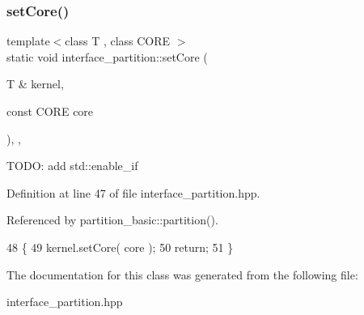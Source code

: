 \hypertarget{classinterface__partition_af7c257c87d13508274e934328ee90f52}{}\label{classinterface__partition_af7c257c87d13508274e934328ee90f52} 
\subsubsection{\texorpdfstring{set\+Core()}{setCore()}}
{\footnotesize\ttfamily template$<$class T , class C\+O\+RE $>$ \\
static void interface\+\_\+partition\+::set\+Core (\begin{DoxyParamCaption}\item[{T \&}]{kernel,  }\item[{const C\+O\+RE}]{core }\end{DoxyParamCaption})\hspace{0.3cm}{\ttfamily [inline]}, {\ttfamily [static]}, {\ttfamily [protected]}}

T\+O\+DO\+: add std\+::enable\+\_\+if 

Definition at line 47 of file interface\+\_\+partition.\+hpp.



Referenced by partition\+\_\+basic\+::partition().


\begin{DoxyCode}
48     \{
49         kernel.setCore( core );
50         \textcolor{keywordflow}{return};
51     \}
\end{DoxyCode}


The documentation for this class was generated from the following file\+:\begin{DoxyCompactItemize}
\item 
interface\+\_\+partition.\+hpp\end{DoxyCompactItemize}
